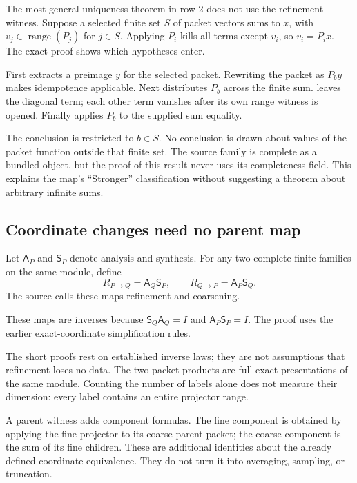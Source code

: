 The most general uniqueness theorem in row 2 does not use the refinement witness. Suppose a selected finite set $S$ of packet vectors sums to $x$, with $v_j\in\operatorname{range}(P_j)$ for $j\in S$. Applying $P_i$ kills all terms except $v_i$, so $v_i=P_i x$. The exact proof shows which hypotheses enter.

First  extracts a preimage $y$ for the selected packet. Rewriting the packet as $P_b y$ makes idempotence applicable. Next  distributes $P_b$ across the finite sum.  leaves the diagonal term; each other term vanishes after its own range witness is opened. Finally  applies $P_b$ to the supplied sum equality.

The conclusion is restricted to $b\in S$. No conclusion is drawn about values of the packet function outside that finite set. The source family is complete as a bundled object, but the proof of this result never uses its completeness field. This explains the map's ``Stronger'' classification without suggesting a theorem about arbitrary infinite sums.

\subsection{Coordinate changes need no parent map}

Let $\mathsf A_P$ and $\mathsf S_P$ denote analysis and synthesis. For any two complete finite families on the same module, define
\[
R_{P\to Q}=\mathsf A_Q\mathsf S_P,
\qquad R_{Q\to P}=\mathsf A_P\mathsf S_Q.
\]
The source calls these maps refinement and coarsening.

These maps are inverses because $\mathsf S_Q\mathsf A_Q=I$ and $\mathsf A_P\mathsf S_P=I$. The proof uses the earlier exact-coordinate simplification rules.

The short  proofs rest on established inverse laws; they are not assumptions that refinement loses no data. The two packet products are full exact presentations of the same module. Counting the number of labels alone does not measure their dimension: every label contains an entire projector range.

A parent witness adds component formulas. The fine component is obtained by applying the fine projector to its coarse parent packet; the coarse component is the sum of its fine children. These are additional identities about the already defined coordinate equivalence. They do not turn it into averaging, sampling, or truncation.

